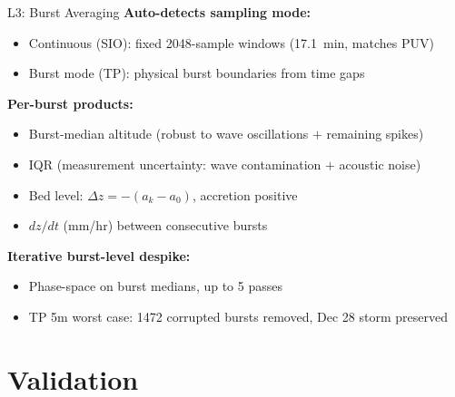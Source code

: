 \documentclass[10pt, aspectratio=169]{beamer}
\begin{document}
\begin{frame}{L3: Burst Averaging}
  \textbf{Auto-detects sampling mode:}
  \begin{itemize}
    \item Continuous (SIO): fixed 2048-sample windows (17.1~min, matches PUV)
    \item Burst mode (TP): physical burst boundaries from time gaps
  \end{itemize}
  \vspace{0.5em}
  \textbf{Per-burst products:}
  \begin{itemize}
    \item Burst-median altitude (robust to wave oscillations $+$ remaining spikes)
    \item IQR (measurement uncertainty: wave contamination $+$ acoustic noise)
    \item Bed level: $\Delta z = -(a_k - a_0)$, accretion positive
    \item $dz/dt$ (mm/hr) between consecutive bursts
  \end{itemize}
  \vspace{0.5em}
  \textbf{Iterative burst-level despike:}
  \begin{itemize}
    \item Phase-space on burst medians, up to 5 passes
    \item TP 5m worst case: 1472 corrupted bursts removed, Dec 28 storm preserved
  \end{itemize}
\end{frame}

\section{Validation}
\end{document}
